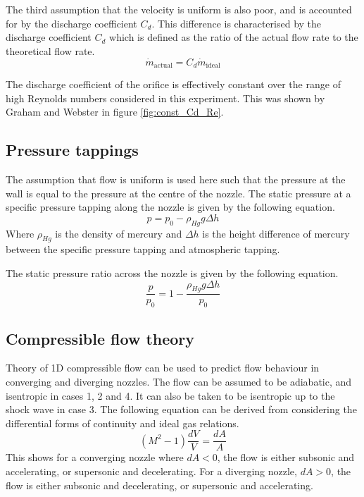 \documentclass{article}
\begin{document}
The third assumption that the velocity is uniform is also poor, and is accounted for by the discharge coefficient $C_d$.
This difference is characterised by the discharge coefficient $C_d$ which is defined as the ratio of the actual flow rate to the theoretical flow rate.
\begin{equation}
    \dot{m}_\text{actual} = C_d \dot{m}_\text{ideal}
\end{equation}

The discharge coefficient of the orifice is effectively constant over the range of high Reynolds numbers considered in this experiment.
This was shown by Graham and Webster \cite{Graham_K_Webster:2019} in figure \ref{fig:const_Cd_Re}.

\subsection{Pressure tappings}
The assumption that flow is uniform is used here such that the pressure at the wall is equal to the pressure at the centre of the nozzle.
The static pressure at a specific pressure tapping along the nozzle is given by the following equation.
\begin{equation}
    p = p_0 - \rho_{Hg} g \Delta h
\end{equation}
Where $\rho_{Hg}$ is the density of mercury and $\Delta h$ is the height difference of mercury between the specific pressure tapping and atmospheric tapping.

The static pressure ratio across the nozzle is given by the following equation.
\begin{equation}
    \frac{p}{p_0} = 1 - \frac{\rho_{Hg} g \Delta h}{p_0}
\end{equation}

\subsection{Compressible flow theory}
Theory of 1D compressible flow can be used to predict flow behaviour in converging and diverging nozzles.
The flow can be assumed to be adiabatic, and isentropic in cases 1, 2 and 4.
It can also be taken to be isentropic up to the shock wave in case 3.
The following equation can be derived from considering the differential forms of continuity and ideal gas relations.
\begin{equation}
    (M^2 - 1)\frac{dV}{V} = \frac{dA}{A}
    \label{eqn:condiv_theory}
\end{equation}
This shows for a converging nozzle where $dA < 0$, the flow is either subsonic and accelerating, or supersonic and decelerating.
For a diverging nozzle, $dA > 0$, the flow is either subsonic and decelerating, or supersonic and accelerating.
\end{document}
